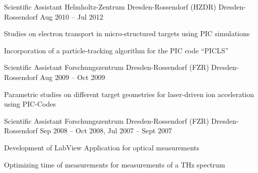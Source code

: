 \begin{cventries}
  \cventry
    {Scientific Assistant} %
    {Helmholtz-Zentrum Dresden-Rossendorf (HZDR)} %
    {Dresden-Rossendorf} %
    {Aug 2010 -- Jul 2012} %
    {
      \begin{cvitems} %
        \item Studies on electron transport in micro-structured targets using PIC simulations
        \item Incorporation of a particle-tracking algorithm for the PIC code ``PICLS''
      \end{cvitems}
    }

  \cventry
    {Scientific Assistant} %
    {Forschungszentrum Dresden-Rossendorf (FZR)} %
    {Dresden-Rossendorf} %
    {Aug 2009 -- Oct 2009} %
    {
      \begin{cvitems} %
        \item Parametric studies on different target geometries for laser-driven ion acceleration using PIC-Codes
      \end{cvitems}
    }

  \cventry
    {Scientific Assistant} %
    {Forschungszentrum Dresden-Rossendorf (FZR)} %
    {Dresden-Rossendorf} %
    {Sep 2008 -- Oct 2008, Jul 2007 -- Sept 2007} %
    {
      \begin{cvitems} %
        \item Development of LabView Application for optical measurements
        \item Optimizing time of measurements for measurements of a THz spectrum
      \end{cvitems}
    }

\end{cventries}